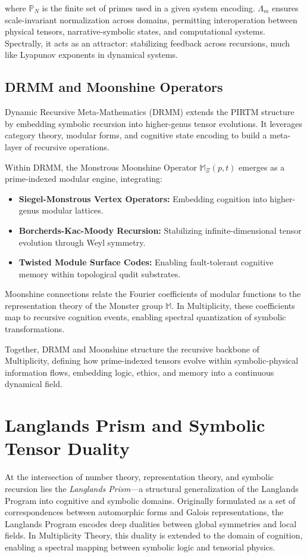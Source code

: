 \documentclass{article}
\theoremstyle{plain}
\begin{document}
where \( \mathbb{P}_N \) is the finite set of primes used in a given system encoding. \( \Lambda_m \) ensures scale-invariant normalization across domains, permitting interoperation between physical tensors, narrative-symbolic states, and computational systems. Spectrally, it acts as an attractor: stabilizing feedback across recursions, much like Lyapunov exponents in dynamical systems.

\subsection{DRMM and Moonshine Operators}

Dynamic Recursive Meta-Mathematics (DRMM) extends the PIRTM structure by embedding symbolic recursion into higher-genus tensor evolutions. It leverages category theory, modular forms, and cognitive state encoding to build a meta-layer of recursive operations.

Within DRMM, the Monstrous Moonshine Operator \( \mathbb{M}_\Xi(p, t) \) emerges as a prime-indexed modular engine, integrating:

\begin{itemize}
    \item \textbf{Siegel-Monstrous Vertex Operators:} Embedding cognition into higher-genus modular lattices.
    \item \textbf{Borcherds-Kac-Moody Recursion:} Stabilizing infinite-dimensional tensor evolution through Weyl symmetry.
    \item \textbf{Twisted Module Surface Codes:} Enabling fault-tolerant cognitive memory within topological qudit substrates.
\end{itemize}

Moonshine connections relate the Fourier coefficients of modular functions to the representation theory of the Monster group \( \mathbb{M} \). In Multiplicity, these coefficients map to recursive cognition events, enabling spectral quantization of symbolic transformations.

Together, DRMM and Moonshine structure the recursive backbone of Multiplicity, defining how prime-indexed tensors evolve within symbolic-physical information flows, embedding logic, ethics, and memory into a continuous dynamical field.
\section{Langlands Prism and Symbolic Tensor Duality}

At the intersection of number theory, representation theory, and symbolic recursion lies the \textit{Langlands Prism}—a structural generalization of the Langlands Program into cognitive and symbolic domains. Originally formulated as a set of correspondences between automorphic forms and Galois representations, the Langlands Program encodes deep dualities between global symmetries and local fields. In Multiplicity Theory, this duality is extended to the domain of cognition, enabling a spectral mapping between symbolic logic and tensorial physics.
\end{document}
